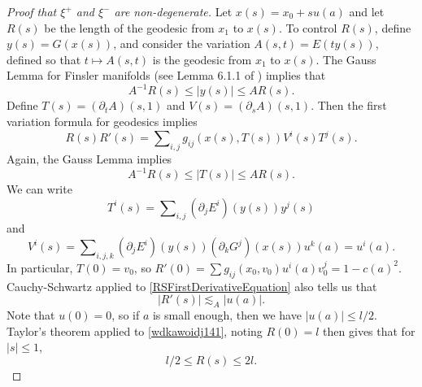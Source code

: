 \begin{proof}[Proof that $\xi^+$ and $\xi^-$ are non-degenerate]
    Let $x(s) = x_0 + s u(a)$ and let $R(s)$ be the length of the geodesic from $x_1$ to $x(s)$. To control $R(s)$, define $y(s) = G(x(s))$, and consider the variation $A(s,t) = E( t y(s) )$, defined so that $t \mapsto A(s,t)$ is the geodesic from $x_1$ to $x(s)$. The Gauss Lemma for Finsler manifolds (see Lemma 6.1.1 of \cite{BaoChern}) implies that
    \begin{equation}
        A^{-1} R(s) \leq |y(s)| \leq A R(s).
    \end{equation}
    Define $T(s) = (\partial_t A)(s,1)$ and $V(s) = (\partial_s A)(s,1)$.
    Then the first variation formula for geodesics implies
    \begin{equation} \label{RSFirstDerivativeEquation}
        R(s) R'(s) = \sum\nolimits_{i,j} g_{ij}( x(s), T(s) ) V^i(s) T^j(s).
    \end{equation}
    Again, the Gauss Lemma implies
    \begin{equation} \label{Idiawjdiwaj213123}
        A^{-1} R(s) \leq |T(s)| \leq A R(s).
    \end{equation}
    We can write
    \begin{equation}
        T^i(s) = \sum\nolimits_{i,j} (\partial_j E^i)( y(s)) y^j(s)
    \end{equation}
    and
    \begin{equation}
        V^i(s) = \sum\nolimits_{i,j,k} (\partial_j E^i) (y(s)) (\partial_k G^j)( x(s)) u^k(a) = u^i(a).
    \end{equation}
    In particular, $T(0) = v_0$, so $R'(0) = \sum g_{ij}(x_0, v_0) u^i(a) v_0^j = 1 - c(a)^2$. Cauchy-Schwartz applied to \eqref{RSFirstDerivativeEquation} also tells us that
    \begin{equation} \label{wdkawoidj141}
        |R'(s)| \lesssim_A |u(a)|.
    \end{equation}
    Note that $u(0) = 0$, so if $a$ is small enough, then we have $|u(a)| \leq l/2$. Taylor's theorem applied to \eqref{wdkawoidj141}, noting $R(0) = l$ then gives that for $|s| \leq 1$,
    \begin{equation} \label{RBound}
        l/2 \leq R(s) \leq 2l.
    \end{equation}

\end{proof}
